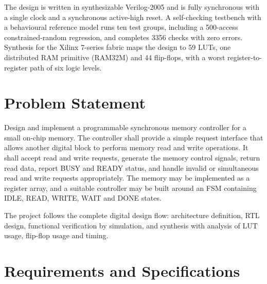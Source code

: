 \documentclass[11pt,a4paper]{article}
\begin{document}
The design is written in synthesizable Verilog-2005 and is fully synchronous with a single clock and a synchronous active-high reset. A self-checking testbench with a behavioural reference model runs ten test groups, including a 500-access constrained-random regression, and completes 3356 checks with zero errors. Synthesis for the Xilinx 7-series fabric maps the design to 59 LUTs, one distributed RAM primitive (RAM32M) and 44 flip-flops, with a worst register-to-register path of six logic levels.

\newpage
\tableofcontents
\listoffigures
\listoftables
\newpage

\section{Problem Statement}
Design and implement a programmable synchronous memory controller for a small on-chip memory. The controller shall provide a simple request interface that allows another digital block to perform memory read and write operations. It shall accept read and write requests, generate the memory control signals, return read data, report BUSY and READY status, and handle invalid or simultaneous read and write requests appropriately. The memory may be implemented as a register array, and a suitable controller may be built around an FSM containing IDLE, READ, WRITE, WAIT and DONE states.

The project follows the complete digital design flow: architecture definition, RTL design, functional verification by simulation, and synthesis with analysis of LUT usage, flip-flop usage and timing.

\section{Requirements and Specifications}
\end{document}
